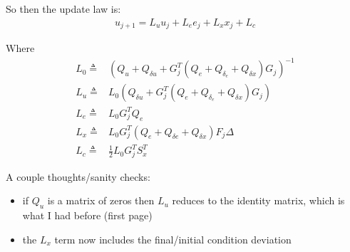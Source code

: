 \documentclass[legalpaper,landscape]{article}
\begin{document}
So then the update law is:
\begin{align}
u_{j+1} =  L_u u_j + L_e e_j + L_x x_{j} + L_c
\end{align}

Where
\begin{align}
L_0 \triangleq & \left(Q_u + Q_{\delta u}  + G_j^T\left( Q_e + Q_{\delta_e} + Q_{\delta x} \right) G_j\right)^{-1} \\
L_u \triangleq &  L_0\left( Q_{\delta u} + G_j^T\left( Q_e + Q_{\delta_e} + Q_{\delta x} \right) G_j \right) \\
L_e \triangleq &  L_0 G_j^T Q_e\\
L_x \triangleq &  L_0 G_j^T \left( Q_e + Q_{\delta e} + Q_{\delta x}\right)F_j \Delta\\
L_c \triangleq &  \frac{1}{2} L_0 G_j^T S_x^T
\end{align}

A couple thoughts/sanity checks:
\begin{itemize}
	\item if $Q_u$ is a matrix of zeros then $L_u$ reduces to the identity matrix, which is what I had before (first page)
	\item the $L_x$ term now includes the final/initial condition deviation
\end{itemize} 
\end{document}
